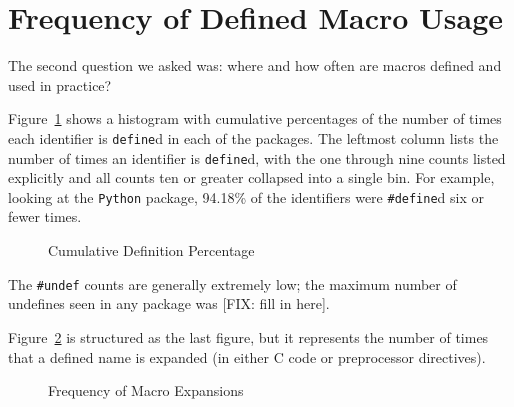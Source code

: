 \section{Frequency of Defined Macro Usage}\label{sec:usage}

The second question we asked was: where and how often are macros
defined and used in practice?  
%
%


Figure~\ref{fig:define_count} shows a histogram with cumulative
percentages of the number of times each identifier is \verb+define+d
in each of the packages.  The leftmost column lists the number of
times an identifier is \verb+define+d, with the one through nine counts
listed explicitly and all counts ten or greater collapsed into a
single bin.  
For example, looking at the \verb+Python+ package, 94.18\% of
the identifiers were \verb+#define+d six or fewer times.  

\begin{figure}
{\small
  \setlength{\tabcolsep}{.25em}
}
\caption{Cumulative Definition Percentage\label{fig:define_count}}
\end{figure}

The \verb+#undef+ counts are generally extremely low; the maximum
number of undefines seen in any package was [FIX: fill in here].

Figure~\ref{fig:use_count} is structured as the last figure, but it
represents the number of times that a defined name is expanded (in
either C code or preprocessor directives).

\begin{figure}
{\small
  \setlength{\tabcolsep}{.25em}
}
\caption{Frequency of Macro Expansions\label{fig:use_count}}
\end{figure}

